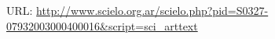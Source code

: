 \documentclass[a4paper,12pt]{article}
\newcommand{\doi}[1]{DOI: \href{https://doi.org/#1}{#1}}
\begin{document}
\thispagestyle{empty}

\vspace{3cm}

\nocite{RM-art-2}
\printbibliography


\vspace{1.5cm}
URL: \url{http://www.scielo.org.ar/scielo.php?pid=S0327-07932003000400016&script=sci_arttext}




\newpage

\end{document}
